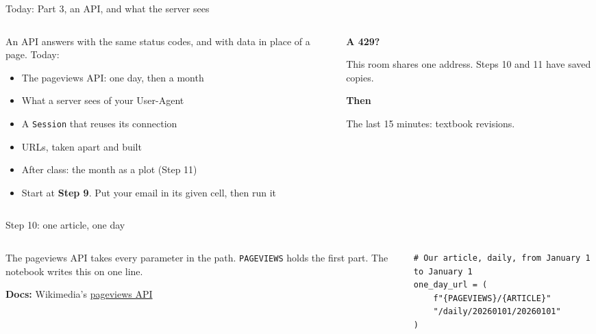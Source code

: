 \documentclass[9pt,aspectratio=169]{beamer}
\begin{document}
\begin{frame}{Today: Part 3, an API, and what the server sees}
    \begin{columns}[T]
        \begin{column}{0.56\textwidth}
            An API answers with the same status codes, and with data in place of a page. Today:
            \begin{itemize}\small
                \item The pageviews API: one day, then a month
                \item What a server sees of your User-Agent
                \item A \texttt{Session} that reuses its connection
                \item URLs, taken apart and built
                \item After class: the month as a plot (Step 11)
            \end{itemize}

            \medskip
            \begin{itemize}\small
                \item Start at \textbf{Step 9}. Put your email in its given cell, then run it
            \end{itemize}
        \end{column}
        \begin{column}{0.4\textwidth}
            \textbf{A 429?}\\[2pt]
            {\footnotesize This room shares one address. Steps 10 and 11 have saved copies.\par}
            \medskip
            \textbf{Then}\\[2pt]
            {\footnotesize The last 15 minutes: textbook revisions.\par}
        \end{column}
    \end{columns}
\end{frame}

\begin{frame}[fragile]{Step 10: one article, one day}
    \begin{columns}[T]
        \begin{column}{0.37\textwidth}
            The pageviews API takes every parameter in the path. \texttt{PAGEVIEWS} holds the first part. The notebook writes this on one line.

            \medskip
            {\scriptsize\textbf{Docs:} Wikimedia's \href{https://doc.wikimedia.org/generated-data-platform/aqs/analytics-api/reference/page-views.html}{pageviews API}\par}
        \end{column}
        \begin{column}{0.6\textwidth}
\begin{lstlisting}[style=lab]
# Our article, daily, from January 1 to January 1
one_day_url = (
    f"{PAGEVIEWS}/{ARTICLE}"
    "/daily/20260101/20260101"
)
\end{lstlisting}
        \end{column}
    \end{columns}
\end{frame}
\end{document}
